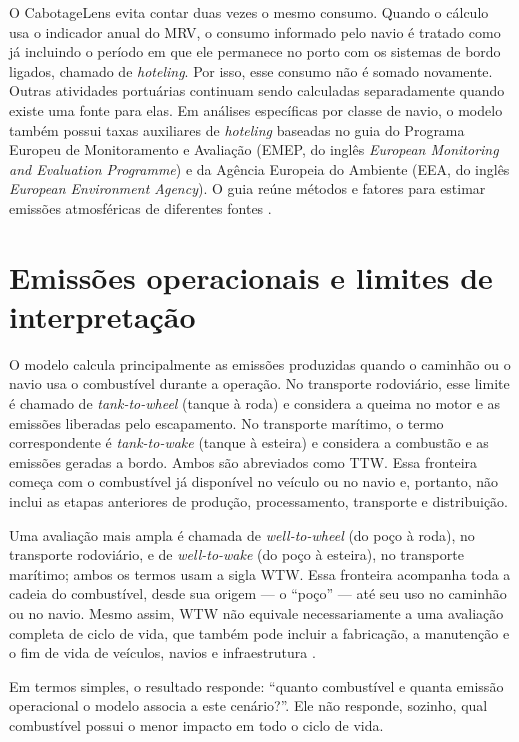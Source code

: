 \documentclass[12pt,a4paper]{report}
\begin{document}
O CabotageLens evita contar duas vezes o mesmo consumo. Quando o cálculo usa o indicador anual do MRV, o consumo informado pelo navio é tratado como já incluindo o período em que ele permanece no porto com os sistemas de bordo ligados, chamado de \emph{hoteling}. Por isso, esse consumo não é somado novamente. Outras atividades portuárias continuam sendo calculadas separadamente quando existe uma fonte para elas. Em análises específicas por classe de navio, o modelo também possui taxas auxiliares de \emph{hoteling} baseadas no guia do Programa Europeu de Monitoramento e Avaliação (EMEP, do inglês \emph{European Monitoring and Evaluation Programme}) e da Agência Europeia do Ambiente (EEA, do inglês \emph{European Environment Agency}). O guia reúne métodos e fatores para estimar emissões atmosféricas de diferentes fontes \citep{emep2023}.

\section{Emissões operacionais e limites de interpretação}

O modelo calcula principalmente as emissões produzidas quando o caminhão ou o navio usa o combustível durante a operação. No transporte rodoviário, esse limite é chamado de \emph{tank-to-wheel} (tanque à roda) e considera a queima no motor e as emissões liberadas pelo escapamento. No transporte marítimo, o termo correspondente é \emph{tank-to-wake} (tanque à esteira) e considera a combustão e as emissões geradas a bordo. Ambos são abreviados como TTW. Essa fronteira começa com o combustível já disponível no veículo ou no navio e, portanto, não inclui as etapas anteriores de produção, processamento, transporte e distribuição.

Uma avaliação mais ampla é chamada de \emph{well-to-wheel} (do poço à roda), no transporte rodoviário, e de \emph{well-to-wake} (do poço à esteira), no transporte marítimo; ambos os termos usam a sigla WTW. Essa fronteira acompanha toda a cadeia do combustível, desde sua origem --- o ``poço'' --- até seu uso no caminhão ou no navio. Mesmo assim, WTW não equivale necessariamente a uma avaliação completa de ciclo de vida, que também pode incluir a fabricação, a manutenção e o fim de vida de veículos, navios e infraestrutura \citep{lifecycle2020,maritimelca2024,decarb2024,biodiesel2017}.

Em termos simples, o resultado responde: ``quanto combustível e quanta emissão operacional o modelo associa a este cenário?''. Ele não responde, sozinho, qual combustível possui o menor impacto em todo o ciclo de vida.
\end{document}
